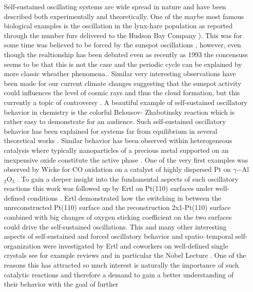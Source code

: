 \documentclass[journal=jacsat,manuscript=article]{achemso}
\begin{document}
Self-sustained oscillating systems are wide spread in nature and have been
described both experimentally and theoretically. One of the maybe most famous
biological examples is the oscillation in the lynx-hare population as reported
through the number furs delivered to the Hudson Bay Company
\cite{MacLulich,Elton1942}). This was for some time was believed to be forced
by the sunspot oscillations \cite{Elton1924}, however, even though the
realtionship has been debated even as recently as 1993\cite{SINCLAIR1993} the
concensuss seems to be that this is not the case \cite{Elton1942,Kielland2010}
and the periodic cycle can be explained by more classic wheather phenomena..
Similar very interesting observations have been made for our current climate
changes \cite{Svensmark1997,Svensmark1998} suggesting that the sunspot activity
could influences the level of cosmic rays and thus the cloud formation, but
this currently a topic of controversy \cite{Lockwood2007}. A beautiful example
of self-sustained oscillatory behavior in chemistry is the colorful Belousov-
Zhabotinsky reaction which is rather easy to demonstrate for an
audience\cite{ZAIKIN1970}. Such self-sustained oscillatory behavior has been
explained for systems far from equilibrium in several theoretical works
\cite{HakenBog,NicolisBog}. Similar behavior has been observed within
heterogeneous catalysis where typically nanoparticles of a precious metal
supported on an inexpensive oxide constitute the active phase \cite{IbsBog}.
One of the very first examples was observed by Wicke for CO oxidation on a
catalyst of highly dispersed Pt on $\gamma$−Al$_2$O$_3$ \cite{BEUSCH1972}. To
gain a deeper insight into the fundamental aspects of such oscillatory
reactions this work was followed up by Ertl on Pt(110) surfaces under well-
defined conditions \cite{EISWIRTH1986}. Ertl demonstrated how the switching in
between the unreconstructed Pt(110) surface and the reconstruction 2x1-Pt(110)
surface combined with big changes of oxygen sticking coefficient on the two
surfaces could drive the self-sustained oscillations. This and many other
interesting aspects of self-sustained and forced oscillatory behavior and
spatio--temporal self-organization were investigated by Ertl and coworkers on
well-defined single crystals see for example reviews
\cite{IMBIHL1995,JAKUBITH1990} and in particular the Nobel Lecture
\cite{Ertl2008}. One of the reasons this has attracted so much interest is
naturally the importance of such catalytic reactions and therefore a demand to
gain a better understanding of their behavior with the goal of further
\end{document}

